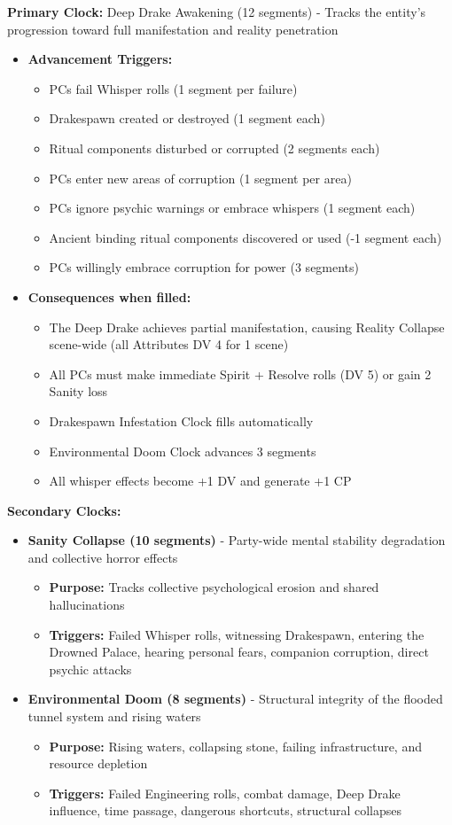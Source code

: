 \documentclass[11pt]{article}
\begin{document}
\textbf{Primary Clock:} Deep Drake Awakening (12 segments) - Tracks the entity's progression toward full manifestation and reality penetration
\begin{itemize}
\item \textbf{Advancement Triggers:}
  \begin{itemize}
  \item PCs fail Whisper rolls (1 segment per failure)
  \item Drakespawn created or destroyed (1 segment each)
  \item Ritual components disturbed or corrupted (2 segments each)
  \item PCs enter new areas of corruption (1 segment per area)
  \item PCs ignore psychic warnings or embrace whispers (1 segment each)
  \item Ancient binding ritual components discovered or used (-1 segment each)
  \item PCs willingly embrace corruption for power (3 segments)
  \end{itemize}
\item \textbf{Consequences when filled:}
  \begin{itemize}
  \item The Deep Drake achieves partial manifestation, causing Reality Collapse scene-wide (all Attributes DV 4 for 1 scene)
  \item All PCs must make immediate Spirit + Resolve rolls (DV 5) or gain 2 Sanity loss
  \item Drakespawn Infestation Clock fills automatically
  \item Environmental Doom Clock advances 3 segments
  \item All whisper effects become +1 DV and generate +1 CP
  \end{itemize}
\end{itemize}

\textbf{Secondary Clocks:}
\begin{itemize}
\item \textbf{Sanity Collapse (10 segments)} - Party-wide mental stability degradation and collective horror effects
  \begin{itemize}
  \item \textbf{Purpose:} Tracks collective psychological erosion and shared hallucinations
  \item \textbf{Triggers:} Failed Whisper rolls, witnessing Drakespawn, entering the Drowned Palace, hearing personal fears, companion corruption, direct psychic attacks
  \end{itemize}
\item \textbf{Environmental Doom (8 segments)} - Structural integrity of the flooded tunnel system and rising waters
  \begin{itemize}
  \item \textbf{Purpose:} Rising waters, collapsing stone, failing infrastructure, and resource depletion
  \item \textbf{Triggers:} Failed Engineering rolls, combat damage, Deep Drake influence, time passage, dangerous shortcuts, structural collapses
  \end{itemize}
\end{itemize}
\end{document}

